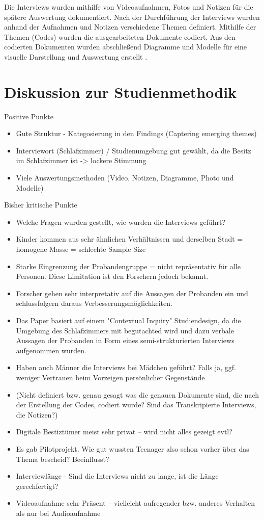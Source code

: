\documentclass{hsflensburg}
\begin{document}
	Die Interviews wurden mithilfe von Videoaufnahmen, Fotos und Notizen für die spätere Auswertung dokumentiert. Nach der Durchführung
	der Interviews wurden anhand der Aufnahmen und Notizen verschiedene Themen
	definiert. Mithilfe der Themen (Codes) wurden die ausgearbeiteten
	Dokumente codiert. Aus den codierten Dokumenten wurden abschließend Diagramme und Modelle für eine visuelle Darstellung und Auswertung erstellt  \cite{odom2011teenagers}. 

	\section{Diskussion zur Studienmethodik}

	Positive Punkte

	\begin{itemize}
	\item Gute Struktur - Kategosierung in den Findings (Captering emerging themes)
 	\item Interviewort (Schlafzimmer) / Studienumgebung  gut gewählt, da die Besitz im Schlafzimmer ist -> lockere Stimmung
 	\item Viele Auswertungsmethoden (Video, Notizen, Diagramme, Photo und Modelle)
	\end{itemize}

	Bisher kritische Punkte

	\begin{itemize}
	\item Welche Fragen wurden gestellt, wie wurden die Interviews geführt?
	\item Kinder kommen aus sehr ähnlichen Verhältnissen und derselben Stadt = homogene Masse = schlechte Sample Size
	\item Starke Eingrenzung der Probandengruppe = nicht repräsentativ für alle Personen. Diese Limitation ist den Forschern jedoch bekannt.
	\item Forscher gehen sehr interpretativ auf die Aussagen der Probanden ein und schlussfolgern daraus Verbesserungsmöglichkeiten.
	\item Das Paper basiert auf einem "Contextual Inquiry" Studiendesign, da die Umgebung des Schlafzimmers mit begutachted wird und dazu verbale Aussagen der Probanden in Form eines semi-strukturierten Interviews aufgenommen wurden.
	\item Haben auch Männer die Interviews bei Mädchen geführt? Falls ja, ggf. weniger Vertrauen beim Vorzeigen persönlicher Gegenstände
	\item (Nicht definiert bzw. genau gesagt was die genauen Dokumente sind, die nach der Erstellung der Codes, codiert wurde? Sind
		das Transkripierte Interviews, die Notizen?)
		\item Digitale Bestiztümer meist sehr privat – wird nicht alles gezeigt evtl?
		\item Es gab Pilotprojekt. Wie gut wussten Teenager also schon vorher über das Thema bescheid? Beeinflusst?
		\item Interviewlänge - Sind die Interviews nicht zu lange, ist die Länge gerechfertigt?
		\item Videoaufnahme sehr Präsent – vielleicht aufregender bzw. anderes Verhalten als nur bei Audioaufnahme
	\end{itemize}
	

	\clearpage
	\nocite{*}	
	
	
\end{document}

